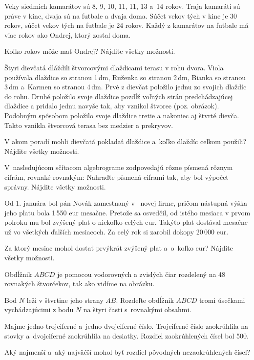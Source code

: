 {%
Veky siedmich kamarátov sú 8, 9, 10, 11, 11, 13 a~14 rokov.
Traja kamaráti sú práve v kine, dvaja sú na futbale a dvaja doma.
Súčet vekov tých v kine je 30 rokov, súčet vekov tých na futbale je 24 rokov.
Každý z kamarátov na futbale má viac rokov ako Ondrej, ktorý zostal doma.

Koľko rokov môže mať Ondrej?
Nájdite všetky možnosti.
}

{%
Štyri dievčatá dláždili štvorcovými dlaždicami terasu v rohu dvora.
Viola používala dlaždice so stranou 1\,dm, Ruženka so stranou 2\,dm, Bianka so stranou 3\,dm a~Karmen so stranou 4\,dm.
Prvé z dievčat položilo jednu zo svojich dlaždíc do rohu.
Druhé položilo svoje dlaždice pozdĺž voľných strán predchádzajúcej dlaždice a pridalo jednu navyše tak, aby vznikol štvorec (poz. obrázok).
Podobným spôsobom položilo svoje dlaždice tretie a nakoniec aj štvrté dievča.
Takto vznikla štvorcová terasa bez medzier a prekryvov.

V akom poradí mohli dievčatá pokladať dlaždice a~koľko dlaždíc celkom použili?
Nájdite všetky možnosti.
%
}

{%
V~nasledujúcom sčítacom algebrograme zodpovedajú rôzne písmená rôznym cifrám, rovnaké rovnakým:
Nahraďte písmená ciframi tak, aby bol výpočet správny.
Nájdite všetky možnosti.
}

{%
Od 1. januára bol pán Novák zamestnaný v ~novej firme, pričom nástupná výška jeho platu bola 1\,550 eur mesačne.
Pretože sa osvedčil, od istého mesiaca v prvom polroku mu bol zvýšený plat o niekoľko celých eur. Takýto plat dostával mesačne už vo všetkých ďalších mesiacoch.
Za celý rok si zarobil dokopy 20\,000 eur.

Za ktorý mesiac mohol dostať prvýkrát zvýšený plat a~o~koľko eur?
Nájdite všetky možnosti.
}

{%
Obdĺžnik $ABCD$ je pomocou vodorovných a zvislých čiar rozdelený na 48 rovnakých štvorčekov, tak ako vidíme na obrázku.
%

Bod $N$ leži v štvrtine jeho strany $AB$. Rozdeľte obdĺžnik $ABCD$ tromi úsečkami vychádzajúcimi z bodu $N$
na štyri časti s~rovnakými obsahmi.
}

{%
Majme jedno trojciferné a~jedno dvojciferné číslo.
Trojciferné číslo zaokrúhlila na stovky a~dvojciferné zaokrúhlila na desiatky.
Rozdiel zaokrúhlených čísel bol 500.

Aký najmenší a~aký najväčší mohol byť rozdiel pôvodných nezaokrúhlených čísel?
}

